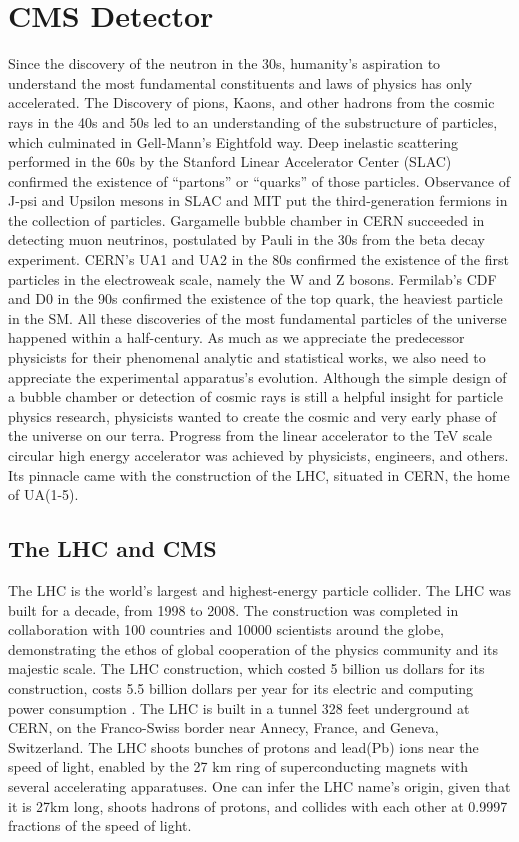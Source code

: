 \chapter{CMS Detector}\label{sec:detectors}
Since the discovery of the neutron in the 30s, humanity's aspiration to understand the most fundamental constituents and laws of physics has only accelerated.
The Discovery of pions, Kaons, and other hadrons from the cosmic rays in the 40s and 50s led to an understanding of the substructure of particles, which culminated in Gell-Mann's Eightfold way.
Deep inelastic scattering performed in the 60s by the Stanford Linear Accelerator Center (SLAC) confirmed the existence of ``partons'' or ``quarks'' of those particles.
Observance of J-psi and Upsilon mesons in SLAC and MIT put the third-generation fermions in the collection of particles.
Gargamelle bubble chamber in CERN succeeded in detecting muon neutrinos, postulated by Pauli in the 30s from the beta decay experiment.
CERN's UA1 and UA2 in the 80s confirmed the existence of the first particles in the electroweak scale, namely the W and Z bosons.
Fermilab's CDF and D0 in the 90s confirmed the existence of the top quark, the heaviest particle in the SM.
All these discoveries of the most fundamental particles of the universe happened within a half-century.
As much as we appreciate the predecessor physicists for their phenomenal analytic and statistical works, we also need to appreciate the experimental apparatus's evolution.
Although the simple design of a bubble chamber or detection of cosmic rays is still a helpful insight for particle physics research, physicists wanted to create the cosmic and very early phase of the universe on our terra.
Progress from the linear accelerator to the TeV scale circular high energy accelerator was achieved by physicists, engineers, and others.
Its pinnacle came with the construction of the LHC, situated in CERN, the home of UA(1-5).


\section{The LHC and CMS}
The LHC is the world's largest and highest-energy particle collider.
The LHC was built for a decade, from 1998 to 2008.
The construction was completed in collaboration with 100 countries and 10000 scientists around the globe, demonstrating the ethos of global cooperation of the physics community and its majestic scale.
The LHC construction, which costed 5 billion us dollars for its construction, costs 5.5 billion dollars per year for its electric and computing power consumption \cite{LHCweb}.
The LHC is built in a tunnel 328 feet underground at CERN, on the Franco-Swiss border near Annecy, France, and  Geneva, Switzerland.
The LHC shoots bunches of protons and lead(Pb) ions near the speed of light, enabled by the 27 km ring of superconducting magnets with several accelerating apparatuses.
One can infer the LHC name's origin, given that it is 27km long, shoots hadrons of protons, and collides with each other at 0.9997 fractions of the speed of light.

